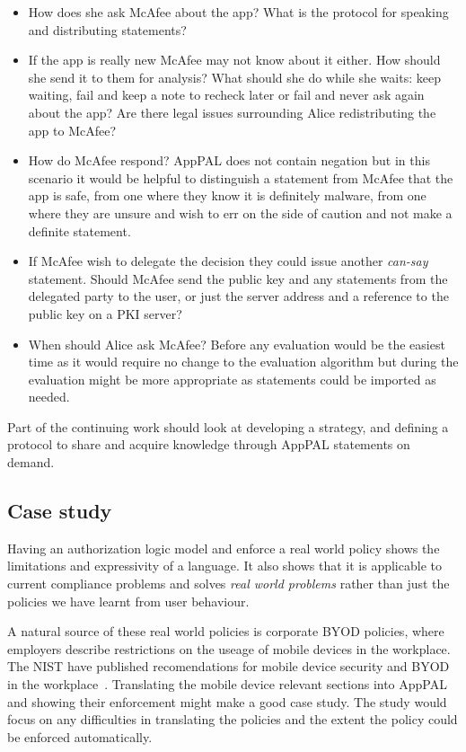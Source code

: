 \documentclass[a4paper]{scrartcl}
\begin{document}
\begin{itemize}
  \item How does she ask McAfee about the app?  What is the protocol for speaking and distributing statements?
  \item If the app is really new McAfee may not know about it either. How should she send it to them for analysis?  What should she do while she waits: keep waiting, fail and keep a note to recheck later or fail and never ask again about the app?  Are there legal issues surrounding Alice redistributing the app to McAfee?
  \item How do McAfee respond?  AppPAL does not contain negation but in this scenario it would be helpful to distinguish a statement from McAfee that the app is safe, from one where they know it is definitely malware, from one where they are unsure and wish to err on the side of caution and not make a definite statement.
  \item If McAfee wish to delegate the decision they could issue another \emph{can-say} statement.   Should McAfee send the public key and any statements from the delegated party to the user, or just the server address and a reference to the public key on a PKI server?
  \item When should Alice ask McAfee?  Before any evaluation would be the easiest time as it would require no change to the evaluation algorithm but during the evaluation might be more appropriate as statements could be imported as needed.
\end{itemize}

Part of the continuing work should look at developing a strategy, and defining a protocol to share and acquire knowledge through AppPAL statements on demand.

\subsection{Case study}

Having an authorization logic model and enforce a real world policy shows the limitations and expressivity of a language.
It also shows that it is applicable to current compliance problems and solves \emph{real world problems} rather than just the policies we have learnt from user behaviour.

A natural source of these real world policies is corporate \ac{BYOD} policies, where employers describe restrictions on the useage of mobile devices in the workplace.
The \ac{NIST} have published recomendations for mobile device security and \ac{BYOD} in the workplace~\citep{Souppaya:2013jf,Scarfone:2009vy}.
Translating the mobile device relevant sections into AppPAL and showing their enforcement might make a good case study.
The study would focus on any difficulties in translating the policies and the extent the policy could be enforced automatically.
\end{document}
